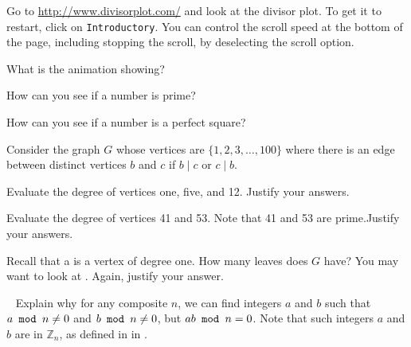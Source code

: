 \begin{exer}[\exerE] %
\label{exer_divisor_plot}  
Go to \url{http://www.divisorplot.com/} and look at the divisor plot. To get it to restart, click on \texttt{Introductory}.  You can control the scroll speed at the bottom of the page, including stopping the scroll, by deselecting the scroll option. 
    \begin{exerpart}
        \item What is the animation showing?
        \item How can you see if a number is prime?
        \item How can you see if a number is a perfect square?
    \end{exerpart}
\end{exer}

\begin{exer}[\exerE] %
\label{exer_divides_graph_1to100}
    Consider the graph $G$ whose vertices are $\{1,2,3,\ldots,100\}$ where there is an edge between distinct vertices $b$ and $c$ if $b \mid c$ or $c \mid b$. 
        \begin{exerpart}
            \item Evaluate the degree of vertices one, five, and 12.  Justify your answers.
            \item Evaluate the degree of vertices 41 and 53.  Note that 41 and 53 are prime.Justify your answers.
            \item Recall that a  is a vertex of degree one.  How many leaves does $G$ have?  You may want to look at . Again, justify your answer.
        \end{exerpart}
\end{exer}

\begin{exer}[\exerE] %
\label{exer_zero_div_mod_composite}
~
    Explain why for any composite $n$, we can find integers $a$ and $b$ such that $a \texttt{ mod } n \neq 0$ and $b \texttt{ mod } n \neq 0$, but $ab \texttt{ mod } n = 0$.  Note that such integers $a$ and $b$ are  in $\mathbb{Z}_n$, as defined in  in . 
\end{exer}

